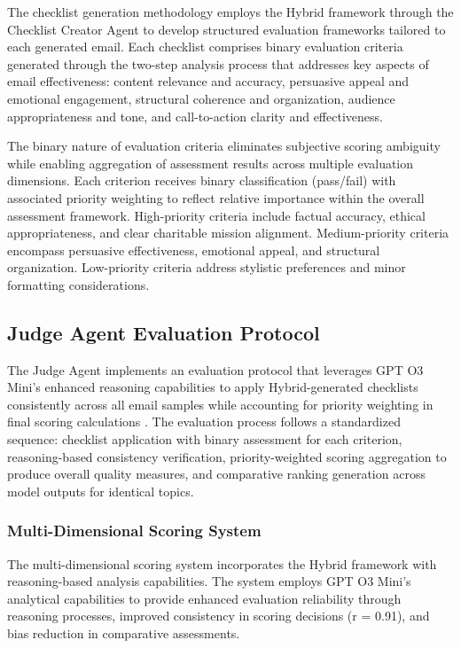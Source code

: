 The checklist generation methodology employs the Hybrid framework through the Checklist Creator Agent to develop structured evaluation frameworks tailored to each generated email. Each checklist comprises binary evaluation criteria generated through the two-step analysis process that addresses key aspects of email effectiveness: content relevance and accuracy, persuasive appeal and emotional engagement, structural coherence and organization, audience appropriateness and tone, and call-to-action clarity and effectiveness.

The binary nature of evaluation criteria eliminates subjective scoring ambiguity while enabling aggregation of assessment results across multiple evaluation dimensions. Each criterion receives binary classification (pass/fail) with associated priority weighting to reflect relative importance within the overall assessment framework. High-priority criteria include factual accuracy, ethical appropriateness, and clear charitable mission alignment. Medium-priority criteria encompass persuasive effectiveness, emotional appeal, and structural organization. Low-priority criteria address stylistic preferences and minor formatting considerations.

\subsection{Judge Agent Evaluation Protocol}

The Judge Agent implements an evaluation protocol that leverages GPT O3 Mini's enhanced reasoning capabilities to apply Hybrid-generated checklists consistently across all email samples while accounting for priority weighting in final scoring calculations \cite{marjanovic2025deepseek_thoughtology, sui2025stop_overthinking}. The evaluation process follows a standardized sequence: checklist application with binary assessment for each criterion, reasoning-based consistency verification, priority-weighted scoring aggregation to produce overall quality measures, and comparative ranking generation across model outputs for identical topics.

\subsubsection{Multi-Dimensional Scoring System}

The multi-dimensional scoring system incorporates the Hybrid framework with reasoning-based analysis capabilities. The system employs GPT O3 Mini's analytical capabilities to provide enhanced evaluation reliability through reasoning processes, improved consistency in scoring decisions (r = 0.91), and bias reduction in comparative assessments.

